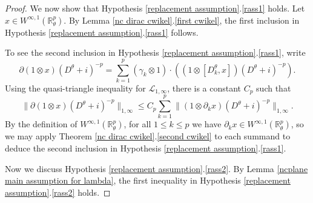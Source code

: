 \begin{proof}
        We now show that Hypothesis \ref{replacement assumption}.\eqref{rass1} holds. 
        Let $x \in W^{\infty,1}(\mathbb{R}^p_\theta)$. By Lemma \ref{nc dirac cwikel}.\eqref{first cwikel}, the first inclusion in Hypothesis \ref{replacement assumption}.\eqref{rass1} follows. 
        
        To see the second inclusion in Hypothesis \ref{replacement assumption}.\eqref{rass1}, write
        \begin{equation*}
            \partial(1\otimes x)(D^\theta+i)^{-p} = \sum_{k=1}^p \left(\gamma_k\otimes 1\right)\cdot\left((1\otimes [D_k^\theta,x])(D^\theta+i)^{-p}\right).
        \end{equation*}
        Using the quasi-triangle inequality for $\mathcal{L}_{1,\infty}$, there is a constant $C_p$ such that
        \begin{equation*}
            \|\partial(1\otimes x)(D^\theta+i)^{-p}\|_{1,\infty} \leq C_p\sum_{k=1}^p \|(1\otimes \partial_k x)(D^\theta+i)^{-p}\|_{1,\infty}.
        \end{equation*}
        By the definition of $W^{\infty,1}(\mathbb{R}^p_\theta)$, for all $1 \leq k \leq p$ we have $\partial_k x \in W^{\infty,1}(\mathbb{R}^p_\theta)$, so we may apply Theorem \ref{nc dirac cwikel}.\eqref{second cwikel} to each summand to deduce the second inclusion in Hypothesis \ref{replacement assumption}.\eqref{rass1}.
        
        Now we discuss Hypothesis \ref{replacement assumption}.\eqref{rass2}. By Lemma \ref{ncplane main assumption for lambda}, the first inequality in Hypothesis \ref{replacement assumption}.\eqref{rass2} holds.
        

\end{proof}
